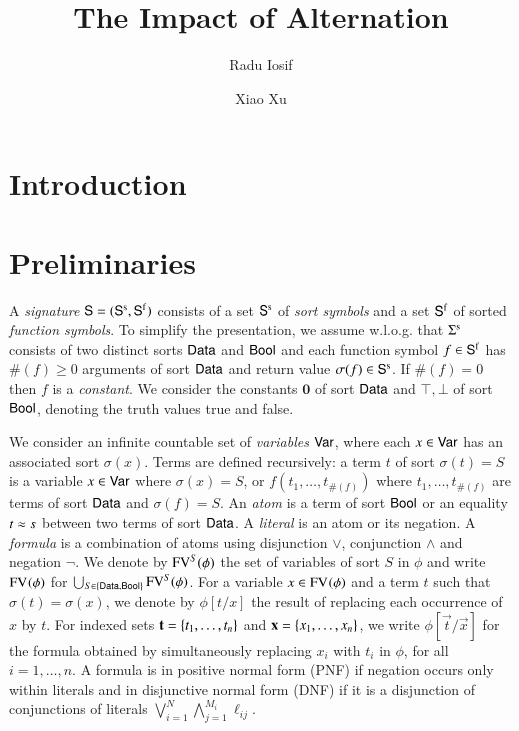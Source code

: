 \documentclass{llncs}
\begin{document}

\title{The Impact of Alternation}

\author{Radu Iosif \and Xiao Xu}


\maketitle

\begin{abstract}
\end{abstract}

\section{Introduction}

\section{Preliminaries}

A \emph{signature} $\mathsf{S} = (\mathsf{S}^\mathrm{s},\mathsf{S}^\mathrm{f})$ consists of a
set $\mathsf{S}^\mathrm{s}$ of \emph{sort symbols} and a set $\mathsf{S}^\mathrm{f}$ of
sorted \emph{function symbols}. To simplify the presentation, we
assume w.l.o.g. that $\Sigma^\mathrm{s}$ consists of two distinct sorts
$\mathsf{Data}$ and $\mathsf{Bool}$ and each function symbol $f \in \mathsf{S}^\mathrm{f}$ has
$\#(f) \geq 0$ arguments of sort $\mathsf{Data}$ and return value $\sigma(f)
\in \mathsf{S}^\mathrm{s}$. If $\#(f)=0$ then $f$ is a \emph{constant}. We
consider the constants $\mathbf{0}$ of sort $\mathsf{Data}$ and $\top,\bot$ of
sort $\mathsf{Bool}$, denoting the truth values true and false.

We consider an infinite countable set of \emph{variables} $\mathsf{Var}$,
where each $x \in \mathsf{Var}$ has an associated sort $\sigma(x)$. Terms are
defined recursively: a term $t$ of sort $\sigma(t)=S$ is a variable $x
\in \mathsf{Var}$ where $\sigma(x)=S$, or $f(t_1,\ldots,t_{\#(f)})$ where
$t_1,\ldots,t_{\#(f)}$ are terms of sort $\mathsf{Data}$ and $\sigma(f)=S$. An
\emph{atom} is a term of sort $\mathsf{Bool}$ or an equality $t \approx s$
between two terms of sort $\mathsf{Data}$. A \emph{literal} is an atom or its
negation. A \emph{formula} is a combination of atoms using disjunction
$\vee$, conjunction $\wedge$ and negation $\neg$. We denote by
$\mathrm{FV}^{S}(\phi)$ the set of variables of sort $S$ in $\phi$ and write
$\mathrm{FV}^{}(\phi)$ for $\bigcup_{S \in \left\{ \mathsf{Data},\mathsf{Bool} \right\}}
\mathrm{FV}^{S}(\phi)$. For a variable $x \in \mathrm{FV}^{}(\phi)$ and a term $t$ such
that $\sigma(t) = \sigma(x)$, we denote by $\phi[t/x]$ the result of
replacing each occurrence of $x$ by $t$. For indexed sets
$\mathbf t=\left\{ t_1,\ldots,t_n \right\}$ and $\mathbf x=\left\{ x_1,\ldots,x_n \right\}$, we
write $\phi[\vec{t}/\vec{x}]$ for the formula obtained by
simultaneously replacing $x_i$ with $t_i$ in $\phi$, for all
$i=1,\ldots,n$. A formula is in positive normal form (PNF) if negation
occurs only within literals and in disjunctive normal form (DNF) if it
is a disjunction of conjunctions of literals $\bigvee_{i=1}^N
\bigwedge_{j=1}^{M_i} \ell_{ij}$.
\end{document}
